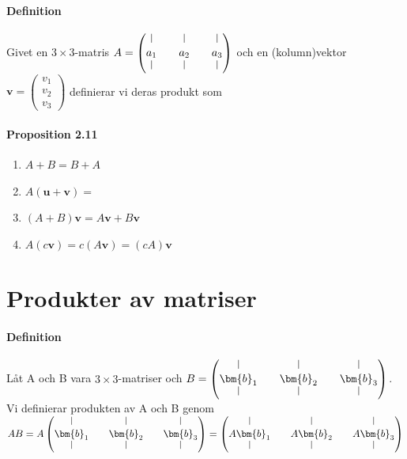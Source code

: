 \paragraph{Definition} Givet en $3\times 3$-matris $A=\begin{pmatrix}
    \line(0,1){8}&&\line(0,1){8}&&\line(0,1){8}\\
    a_{1}&&a_{2}&&a_{3}\\
    \line(0,1){8}&&\line(0,1){8}&&\line(0,1){8}
\end{pmatrix}$ och en (kolumn)vektor $\bm{v}=\begin{pmatrix}v_{1}\\v_{2}\\v_{3}\end{pmatrix}$ definierar vi deras
produkt som  %

\paragraph{Proposition 2.11} 
\begin{enumerate}
    \item $A+B=B+A$
    \item $A(\bm{u}+\bm{v})=$
    \item $(A+B)\bm{v}=A\bm{v}+B\bm{v}$
    \item $A(c\bm{v})=c(A\bm{v})=(cA)\bm{v}$
\end{enumerate}
\section{Produkter av matriser}
\paragraph{Definition} Låt A och B vara $3\times 3$-matriser och $B=\begin{pmatrix}
    \line(0,1){8}&&\line(0,1){8}&&\line(0,1){8}\\
    \bm{b}_{1}&&\bm{b}_{2}&&\bm{b}_{3}\\
    \line(0,1){8}&&\line(0,1){8}&&\line(0,1){8}
\end{pmatrix}$.\\
Vi definierar produkten av A och B genom $AB=A\begin{pmatrix}
    \line(0,1){8}&&\line(0,1){8}&&\line(0,1){8}\\
    \bm{b}_{1}&&\bm{b}_{2}&&\bm{b}_{3}\\
    \line(0,1){8}&&\line(0,1){8}&&\line(0,1){8}
\end{pmatrix}=\begin{pmatrix}
    \line(0,1){8}&&\line(0,1){8}&&\line(0,1){8}\\
    A\bm{b}_{1}&&A\bm{b}_{2}&&A\bm{b}_{3}\\
    \line(0,1){8}&&\line(0,1){8}&&\line(0,1){8}
\end{pmatrix}$

